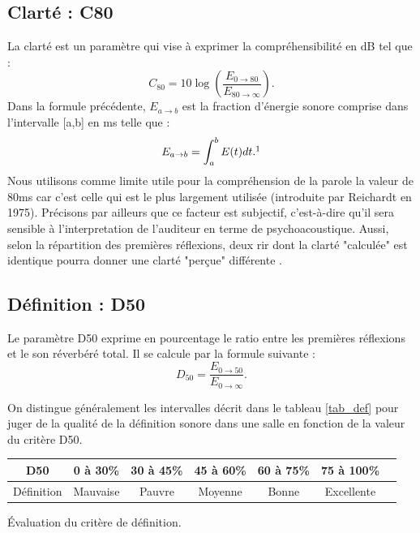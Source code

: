 \subsection{Clarté : \gls{C80}}
La clarté est un paramètre qui vise à exprimer la compréhensibilité en dB tel que :
%
\begin{equation}
C_{80} = 10\log{\left( \frac{E_{0\to80}}{E_{80\to\infty}} \right)}.
\end{equation}
%
Dans la formule précédente, $E_{a\to b}$ est la fraction d'énergie sonore comprise dans l'intervalle [a,b] en ms telle que :
%
\begin{equation}
E_{a\to b} = \int_a^b E(t) dt. \footnotemark
\end{equation}
Nous utilisons comme limite utile pour la compréhension de la parole la valeur de 80ms car c'est celle qui est le plus largement utilisée (introduite par Reichardt \cite[p.126]{Reichardt} en 1975). Précisons par ailleurs que ce facteur est subjectif, c'est-à-dire qu'il sera sensible à l'interpretation de l'auditeur en terme de psychoacoustique. Aussi, selon la répartition des premières réflexions, deux \gls{rir} dont la clarté "calculée" est identique pourra donner une clarté "perçue" différente \cite[p. 226]{jouhaneau}. %
	
\subsection{Définition : \gls{D50}}
Le paramètre \gls{D50} exprime en pourcentage le ratio entre les premières réflexions et le son réverbéré total. Il se calcule par la formule suivante :
\begin{equation}
D_{50} = \frac{E_{0\to50}}{E_{0\to\infty}}.
\end{equation}

On distingue généralement les intervalles décrit dans le tableau \ref{tab_def} \cite[p.59]{acoustique} pour juger de la qualité de la définition sonore dans une salle en fonction de la valeur du critère \gls{D50}. 

\begin{tableth}
	\begin{tabular}{| *{7}{c|}}
		\hline
		 \gls{D50} & 0 à 30\% & 30 à 45\%& 45 à 60\%& 60 à 75\% & 75 à 100\%\\
		  \hline
		   Définition & Mauvaise & Pauvre & Moyenne & Bonne & Excellente \\
		   \hline
	 \end{tabular}
	\caption{Évaluation du critère de définition.}
	 \label{tab_def}
\end{tableth}


